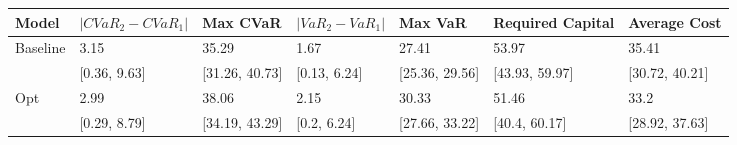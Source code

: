 \begin{tabular}{lllllll}
\toprule
   Model & $|CVaR_2 - CVaR_1|$ &       Max CVaR & $|VaR_2 - VaR_1|$ &        Max VaR & Required Capital &   Average Cost \\
\midrule
Baseline &                3.15 &          35.29 &              1.67 &          27.41 &            53.97 &          35.41 \\
         &        [0.36, 9.63] & [31.26, 40.73] &      [0.13, 6.24] & [25.36, 29.56] &   [43.93, 59.97] & [30.72, 40.21] \\
     Opt &                2.99 &          38.06 &              2.15 &          30.33 &            51.46 &           33.2 \\
         &        [0.29, 8.79] & [34.19, 43.29] &       [0.2, 6.24] & [27.66, 33.22] &    [40.4, 60.17] & [28.92, 37.63] \\
\bottomrule
\end{tabular}
